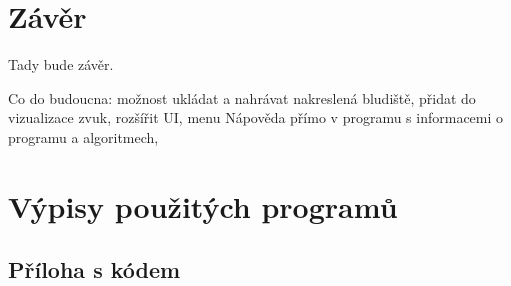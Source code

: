 \documentclass[12pt]{report}			%
\begin{document}
		

	\chapter*{Závěr}
	
		Tady bude závěr.
		
		Co do budoucna: možnost ukládat a nahrávat nakreslená bludiště, přidat do vizualizace zvuk, rozšířit UI, menu Nápověda přímo v programu s informacemi o programu a algoritmech, 
	
	
	\chapter{Výpisy použitých programů}




	
	\nocite{*}
    \printbibliography					%
    \printglossary[title={Zkratky}]		%
    \listoffigures						%
    \listoftables						%

    \begin{appendices}
	\chapter{Příloha s kódem}	

	\end{appendices}
\end{document}
